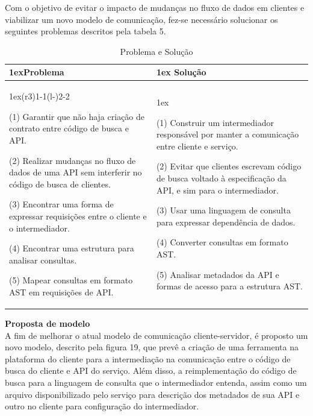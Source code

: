 Com o objetivo de evitar o impacto de mudanças no fluxo de dados em clientes e viabilizar um novo modelo de comunicação, fez-se necessário solucionar os seguintes problemas descritos pela tabela 5. \\

\begin{table}[H]
  \begin{tabularx}{\linewidth}{>{\parskip1ex}X@{\kern4\tabcolsep}>{\parskip1ex}X}
    \toprule
    \hfil\bfseries Problema
    &
    \hfil\bfseries Solução
    \\\cmidrule(r{3\tabcolsep}){1-1}\cmidrule(l{-\tabcolsep}){2-2}

    (1) Garantir que não haja criação de contrato entre código de busca e API.\par
    (2) Realizar mudanças no fluxo de dados de uma API sem interferir no código de busca de clientes.\par
    (3) Encontrar uma forma de expressar requisições entre o cliente e o intermediador.\par
    (4) Encontrar uma estrutura para analisar consultas.\par
    (5) Mapear consultas em formato AST em requisições de API.\par

    &

    (1) Construir um intermediador responsável por manter a comunicação entre cliente e serviço.\par
	(2) Evitar que clientes escrevam código de busca voltado à especificação da API, e sim para o intermediador.\par
    (3) Usar uma linguagem de consulta para expressar dependência de dados.\par
    (4) Converter consultas em formato AST.\par
    (5) Analisar metadados da API e formas de acesso para a estrutura AST.\par

    \\\bottomrule
  \end{tabularx}
  \caption{Problema e Solução}
\end{table}

\textbf{Proposta de modelo} \\

A fim de melhorar o atual modelo de comunicação cliente-servidor, é proposto um novo modelo, descrito pela figura 19, que prevê a criação de uma ferramenta na plataforma do cliente para a intermediação na comunicação entre o código de busca do cliente e API do serviço. Além disso, a reimplementação do código de busca para a linguagem de consulta que o intermediador entenda, assim como um arquivo disponibilizado pelo serviço para descrição dos metadados de sua API e outro no cliente para configuração do intermediador.


